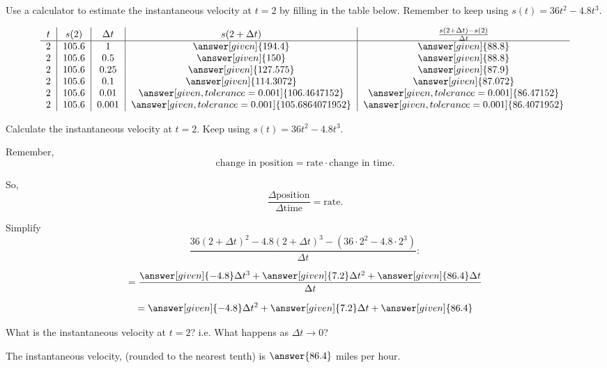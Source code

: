 \documentclass{ximera}
\begin{document}
\begin{problem}
  Use a calculator to estimate the instantaneous velocity at $t=2$ by filling in the table below. Remember to keep using $s(t)=36t^2-4.8t^3$.
  
  \[
\begin{tabular}{c|c|c|c|c}
 $t$ & $s(2)$ & $\Delta t$ & $s(2+\Delta t)$ & $\frac{s(2+\Delta t)-s(2)}{\Delta t}$\\ \hline
$2$ & $105.6$ & $1$ & $\answer[given]{194.4}$ & $\answer[given]{88.8}$\\
$2$ & $105.6$ & $0.5$ & $\answer[given]{150}$ & $\answer[given]{88.8}$\\
$2$ & $105.6$ & $0.25$ & $\answer[given]{127.575}$ & $\answer[given]{87.9}$\\
$2$ & $105.6$ & $0.1$ & $\answer[given]{114.3072}$ & $\answer[given]{87.072}$\\
$2$ & $105.6$ & $0.01$ & $\answer[given, tolerance=0.001]{106.4647152}$ & $\answer[given, tolerance=0.001]{86.47152}$\\
$2$ & $105.6$ & $0.001$ & $\answer[given, tolerance=0.001]{105.6864071952}$ & $\answer[given, tolerance=0.001]{86.4071952}$\\
\end{tabular}
\]

\end{problem}

\begin{problem}
  Calculate the instantaneous velocity at $t=2$. Keep using $s(t)=36t^2-4.8t^3$.
  \begin{hint}
    Remember, 
    \[
    \text{change in position} = \text{rate}\cdot\text{change in time}.
    \]
  \end{hint}
  \begin{hint}
    So, 
    \[
    \frac{\Delta\text{position}}{\Delta\text{time}} = \text{rate}.
    \]
  \end{hint}
  \begin{hint}
    Simplify
    \[
    \frac{36(2+\Delta t)^2 -4.8(2+\Delta t)^3 -\left(36\cdot 2^2 -4.8\cdot 2^3\right) }{\Delta t}:
    \]
    
    \[
    =\frac{\answer[given]{-4.8}\Delta t^3+\answer[given]{7.2}\Delta t^2+\answer[given]{86.4}\Delta t}{\Delta t}
    \]
    
    \[
    =\answer[given]{-4.8}\Delta t^2+\answer[given]{7.2}\Delta t+\answer[given]{86.4}
    \]
    
    What is the instantaneous velocity at $t=2$? i.e. What happens as $\Delta t\rightarrow 0$?
    
  \end{hint}
  \begin{prompt}
  The instantaneous velocity, (rounded to the nearest tenth) is $\answer{86.4}$ miles per hour.
  \end{prompt}
\end{problem}
\end{document}
